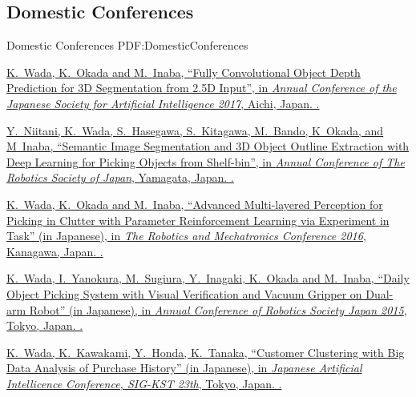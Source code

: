 \documentclass[letterpaper,MMMyyyy,nonstop]{simpleresumecv}
\begin{document}
\begin{body}
\BigGap
\subsection
{Domestic Conferences}
{Domestic Conferences}
{PDF:DomesticConferences}

\GapNoBreak
\NumberedItem{{\CharSpace}[9]}
\href{https://www.ai-gakkai.or.jp/jsai2017}
{\underline{K.~Wada}, K.~Okada and M.~Inaba,
``Fully Convolutional Object Depth Prediction for 3D Segmentation from 2.5D Input'',
in \textit{Annual Conference of the Japanese Society for Artificial Intelligence 2017},
Aichi, Japan.
.}

\GapNoBreak
\NumberedItem{{\CharSpace}[4]}
\href{http://rsj2016.rsj-web.org/}
{Y.~Niitani, \underline{K.~Wada}, S.~Hasegawa, S.~Kitagawa, M.~Bando, K~Okada, and M~Inaba,
``Semantic Image Segmentation and 3D Object Outline Extraction with Deep Learning for Picking Objects from Shelf-bin'',
in \textit{Annual Conference of The Robotics Society of Japan},
Yamagata, Japan.
.}

\GapNoBreak
\NumberedItem{{\CharSpace}[3]}
\href{http://robomech.org/2016/en/}
{\underline{K.~Wada}, K.~Okada and M.~Inaba,
``Advanced Multi-layered Perception for Picking in Clutter with Parameter Reinforcement Learning via Experiment in Task'' (in Japanese),
in \textit{The Robotics and Mechatronics Conference 2016},
Kanagawa, Japan.
.}

\GapNoBreak
\NumberedItem{{\CharSpace}[2]}
\href{http://rsj2015.rsj-web.org/}
{\underline{K.~Wada}, I.~Yanokura, M.~Sugiura, Y.~Inagaki, K.~Okada and M.~Inaba,
``Daily Object Picking System with Visual Verification and Vacuum Gripper on Dual-arm Robot'' (in Japanese),
in \textit{Annual Conference of Robotics Society Japan 2015},
Tokyo, Japan.
.}

\GapNoBreak
\NumberedItem{{\CharSpace}[1]}
\href{http://www.sigkst.org/index.php?site_id=&page=\%C2\%E823\%B2\%F3\%B8\%A6\%B5\%E6\%B2\%F1}
{\underline{K.~Wada}, K.~Kawakami, Y.~Honda, K.~Tanaka,
``Customer Clustering with Big Data Analysis of Purchase History'' (in Japanese),
in \textit{Japanese Artificial Intellicence Conference, SIG-KST 23th},
Tokyo, Japan.
.}



\end{body}
\end{document}
